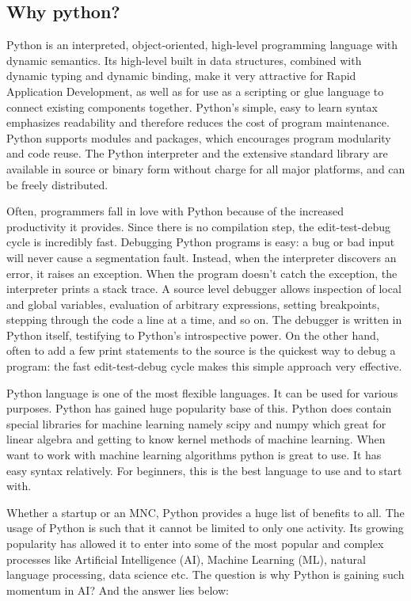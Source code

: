 \subsection{Why python?}

Python is an interpreted, object-oriented, high-level programming language with dynamic semantics. Its high-level built in data structures, combined with dynamic typing and dynamic binding, make it very attractive for Rapid Application Development, as well as for use as a scripting or glue language to connect existing components together. Python's simple, easy to learn syntax emphasizes readability and therefore reduces the cost of program maintenance. Python supports modules and packages, which encourages program modularity and code reuse. The Python interpreter and the extensive standard library are available in source or binary form without charge for all major platforms, and can be freely distributed.

Often, programmers fall in love with Python because of the increased productivity it provides. Since there is no compilation step, the edit-test-debug cycle is incredibly fast. Debugging Python programs is easy: a bug or bad input will never cause a segmentation fault. Instead, when the interpreter discovers an error, it raises an exception. When the program doesn't catch the exception, the interpreter prints a stack trace. A source level debugger allows inspection of local and global variables, evaluation of arbitrary expressions, setting breakpoints, stepping through the code a line at a time, and so on. The debugger is written in Python itself, testifying to Python's introspective power. On the other hand, often to add a few print statements to the source is the quickest way to debug a program: the fast edit-test-debug cycle makes this simple approach very effective.

Python language is one of the most flexible languages. It can be used for various purposes. Python has gained huge popularity base of this. Python does contain special libraries for machine learning namely scipy and numpy which great for linear algebra and getting to know kernel methods of machine learning. When want to work with machine learning algorithms python is great to use. It has easy syntax relatively. For beginners, this is the best language to use and to start with.

Whether a startup or an MNC, Python provides a huge list of benefits to all. The usage of Python is such that it cannot be limited to only one activity. Its growing popularity has allowed it to enter into some of the most popular and complex processes like Artificial Intelligence (AI), Machine Learning (ML), natural language processing, data science etc. The question is why Python is gaining such momentum in AI? And the answer lies below:

